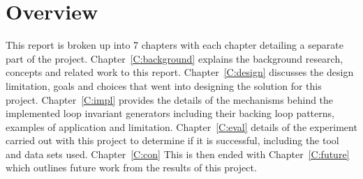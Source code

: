 \section{Overview}

This report is broken up into 7 chapters with each chapter detailing a separate part of the project.
Chapter~\ref{C:background} explains the background research, concepts and related work to this report.
Chapter~\ref{C:design} discusses the design limitation, goals and choices that went into designing the
solution for this project.
Chapter~\ref{C:impl} provides the details of the mechanisms behind the implemented 
loop invariant generators including their backing loop patterns, examples of application and limitation.
Chapter~\ref{C:eval} details of the experiment carried out with this project to determine if it is
successful, including the tool and data sets used. %
Chapter~\ref{C:con} %
This is then ended with Chapter~\ref{C:future} which outlines future work from the results of this project.
